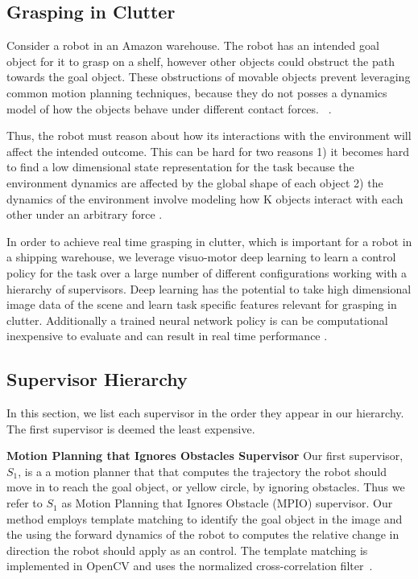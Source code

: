 \documentclass[10pt, conference]{ieeeconf}      %
\begin{document}
\subsection{Grasping in Clutter}\label{sec:task}
Consider a robot in an Amazon warehouse. The robot has an intended goal object for it to grasp on a shelf, however other objects could obstruct the path towards the goal object. These obstructions of movable objects prevent leveraging common motion planning techniques, because they do not posses a dynamics model of how the objects behave under different contact forces. ~\cite{kitaevphysics,kingnonprehensile}.

Thus, the robot must reason about how its interactions with the environment will affect the intended outcome. This can be hard for two reasons 1) it becomes hard to find a low dimensional state representation for the task because the environment dynamics are affected by the global shape of each object 2) the dynamics of the environment  involve modeling how K objects interact with each other under an arbitrary force \cite{kitaevphysics}.

In order to achieve real time grasping in clutter, which is important for a robot in a shipping warehouse, we leverage  visuo-motor deep learning to learn a control policy for the task over a large number of different configurations working with a hierarchy of supervisors. Deep learning has the potential to take high dimensional image data of the scene and learn task specific features relevant for grasping in clutter. Additionally a trained neural network policy is can be computational inexpensive to evaluate and can result in real time performance \cite{levine2015end}.

\subsection{Supervisor Hierarchy}\label{sec:hier}
In this section, we list each supervisor in the order they appear in our hierarchy. The first supervisor is deemed the least expensive. 

\noindent \textbf{Motion Planning that Ignores Obstacles Supervisor} Our first supervisor, $S_1$, is a a motion planner that that computes the trajectory the robot should move in to reach the goal object, or yellow circle, by ignoring obstacles.  Thus we refer to $S_1$ as Motion Planning that Ignores Obstacle (MPIO) supervisor. Our method employs template matching to identify the goal object in the image and the using the forward dynamics of the robot to computes the relative change in direction the robot should apply as an control. The template matching is implemented in OpenCV and uses the normalized cross-correlation filter~\cite{opencv_library}.
\end{document}
